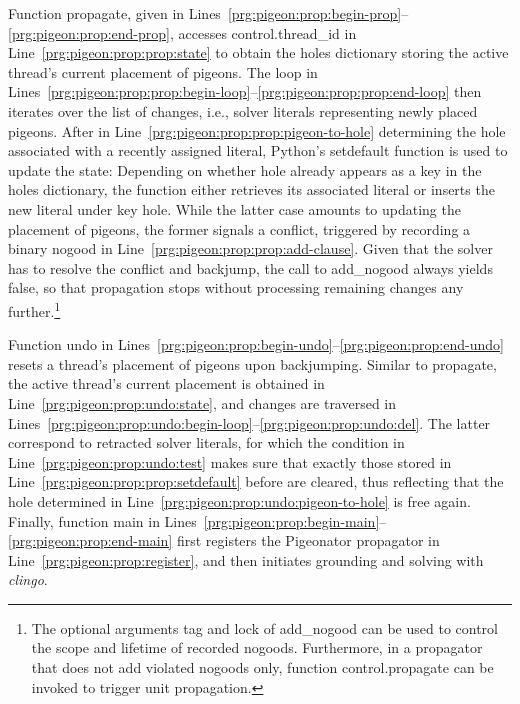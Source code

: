 \documentclass[a4paper,USenglish]{oasics-v2016}
\newcommand{\code}[1]{{\ttfamily #1}}
\newcommand{\codeClass}[2]{\code{#2}}
\newcommand{\sysfont}{\textit}
\newcommand{\clingo}{\sysfont{clingo}}
\newcommand{\python}{Python}
\begin{document}
Function \codeClass{Pigeonator}{propagate}, given in Lines~\ref{prg:pigeon:prop:begin-prop}--\ref{prg:pigeon:prop:end-prop},
accesses \code{control.thread\_id} in Line~\ref{prg:pigeon:prop:prop:state}
to obtain the \code{holes} dictionary storing the active thread's current placement of pigeons.
%
%
The loop in Lines~\ref{prg:pigeon:prop:prop:begin-loop}--\ref{prg:pigeon:prop:prop:end-loop} then iterates over the list of changes,
i.e., solver literals representing newly placed pigeons.
After in Line~\ref{prg:pigeon:prop:prop:pigeon-to-hole}
determining the \code{hole} associated with a recently assigned literal,
%
%
\python's \code{setdefault} function is used to update the state:
Depending on whether \code{hole} already appears as a key in the \code{holes} dictionary,
the function either retrieves its associated literal or inserts the new literal under key \code{hole}. %
While the latter case amounts to updating the placement of pigeons, the former signals a conflict,
triggered by recording a binary nogood in Line~\ref{prg:pigeon:prop:prop:add-clause}.
%
Given that the solver has to resolve the conflict and backjump,
the call to \code{add\_nogood} always yields false, so that
propagation stops without processing remaining changes any further.\footnote{%
  The optional arguments \code{tag} and \code{lock} of \code{add\_nogood} can be used to control the scope and lifetime of recorded nogoods.
  Furthermore, in a propagator that does not add violated nogoods only, %
  function \code{control.propagate} can be invoked to trigger unit propagation.
  }


Function \codeClass{Pigeonator}{undo} in Lines~\ref{prg:pigeon:prop:begin-undo}--\ref{prg:pigeon:prop:end-undo} resets a thread's placement of pigeons upon backjumping.
Similar to \codeClass{Pigeonator}{propagate}, %
the active thread's current placement
is obtained in Line~\ref{prg:pigeon:prop:undo:state},
and changes are traversed in Lines~\ref{prg:pigeon:prop:undo:begin-loop}--\ref{prg:pigeon:prop:undo:del}.
%
%
The latter correspond to retracted solver literals,
for which the condition in Line~\ref{prg:pigeon:prop:undo:test} makes sure
that exactly those stored in Line~\ref{prg:pigeon:prop:prop:setdefault} before are cleared,
thus reflecting that the \code{hole} determined in Line~\ref{prg:pigeon:prop:undo:pigeon-to-hole}
is free again.
%
Finally,
function \code{main} in Lines~\ref{prg:pigeon:prop:begin-main}--\ref{prg:pigeon:prop:end-main} first registers the \code{Pigeonator} propagator in Line~\ref{prg:pigeon:prop:register},
and then initiates grounding and solving with \clingo.
\end{document}
